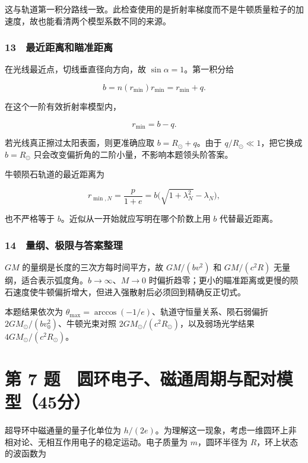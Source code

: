 \documentclass[12pt,a4paper,fontset=fandol]{ctexart}
\begin{document}
这与轨道第一积分路线一致。此检查使用的是折射率梯度而不是牛顿质量粒子的加速度，故也能看清两个模型系数不同的来源。

\subsubsection{13　最近距离和瞄准距离}\label{ux6700ux8fd1ux8dddux79bbux548cux7784ux51c6ux8dddux79bb}

在光线最近点，切线垂直径向方向，故 \(\sin\alpha=1\)。第一积分给

\[b=n(r_{\min})r_{\min}=r_{\min}+q.\]

在这个一阶有效折射率模型内，

\[r_{\min}=b-q.\]

若光线真正擦过太阳表面，则更准确应取 \(b=R_\odot+q\)。由于
\(q/R_\odot\ll1\)，把它换成 \(b=R_\odot\)
只会改变偏折角的二阶小量，不影响本题领头阶答案。

牛顿陨石轨道的最近距离为

\[r_{\min,N}=\frac{p}{1+e}
=b\big(\sqrt{1+\lambda_N^2}-\lambda_N\big),\]

也不严格等于 \(b\)。近似从一开始就应写明在哪个阶数上用 \(b\)
代替最近距离。

\subsubsection{14　量纲、极限与答案整理}\label{ux91cfux7eb2ux6781ux9650ux4e0eux7b54ux6848ux6574ux7406}

\(GM\) 的量纲是长度的三次方每时间平方，故 \(GM/(bv^2)\) 和 \(GM/(c^2R)\)
无量纲，适合表示弧度角。\(b\to\infty\)、\(M\to0\)
时偏折趋零；更小的瞄准距离或更慢的陨石速度使牛顿偏折增大，但进入强散射后必须回到精确反正切式。

本题结果依次为
\(\theta_{\max}=\arccos(-1/e)\)、轨道守恒量关系、陨石弱偏折
\(2GM_\odot/(bv_0^2)\)、牛顿光束对照
\(2GM_\odot/(c^2R_\odot)\)，以及弱场光学结果
\(4GM_\odot/(c^2R_\odot)\)。

\clearpage

\section{第 7
题　圆环电子、磁通周期与配对模型（45分）}\label{ux7b2c-7-ux9898-ux5706ux73afux7535ux5b50ux78c1ux901aux5468ux671fux4e0eux914dux5bf9ux6a21ux578b45ux5206}

超导环中磁通量的量子化单位为
\(h/(2e)\)。为理解这一现象，考虑一维圆环上非相对论、无相互作用电子的稳定运动。电子质量为
\(m\)，圆环半径为 \(R\)，环上状态的波函数为
\end{document}
